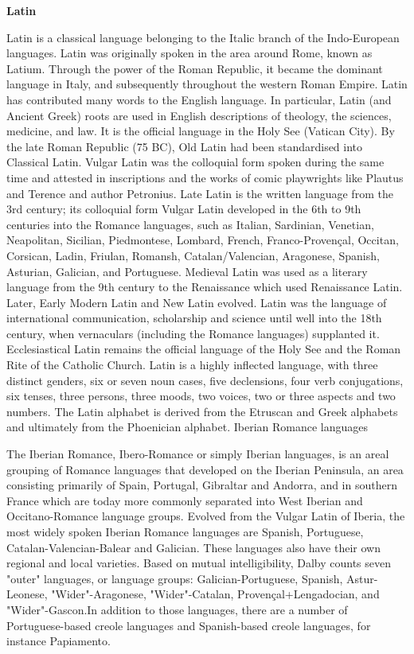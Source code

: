 \documentclass[11pt]{scrartcl} %
\begin{document}
\noindent \textbf{Latin} \par

Latin is a classical language belonging to the Italic branch of the Indo-European languages. Latin was originally spoken in the area around Rome, known as Latium. Through the power of the Roman Republic, it became the dominant language in Italy, and subsequently throughout the western Roman Empire. Latin has contributed many words to the English language. In particular, Latin (and Ancient Greek) roots are used in English descriptions of theology, the sciences, medicine, and law. It is the official language in the Holy See (Vatican City). By the late Roman Republic (75 BC), Old Latin had been standardised into Classical Latin. Vulgar Latin was the colloquial form spoken during the same time and attested in inscriptions and the works of comic playwrights like Plautus and Terence and author Petronius. Late Latin is the written language from the 3rd century; its colloquial form Vulgar Latin developed in the 6th to 9th centuries into the Romance languages, such as Italian, Sardinian, Venetian, Neapolitan, Sicilian, Piedmontese, Lombard, French, Franco-Provençal, Occitan, Corsican, Ladin, Friulan, Romansh, Catalan/Valencian, Aragonese, Spanish, Asturian, Galician, and Portuguese. Medieval Latin was used as a literary language from the 9th century to the Renaissance which used Renaissance Latin. Later, Early Modern Latin and New Latin evolved. Latin was the language of international communication, scholarship and science until well into the 18th century, when vernaculars (including the Romance languages) supplanted it. Ecclesiastical Latin remains the official language of the Holy See and the Roman Rite of the Catholic Church. Latin is a highly inflected language, with three distinct genders, six or seven noun cases, five declensions, four verb conjugations, six tenses, three persons, three moods, two voices, two or three aspects and two numbers. The Latin alphabet is derived from the Etruscan and Greek alphabets and ultimately from the Phoenician alphabet.
Iberian Romance languages \par
The Iberian Romance, Ibero-Romance or simply Iberian languages, is an areal grouping of Romance languages that developed on the Iberian Peninsula, an area consisting primarily of Spain, Portugal, Gibraltar and Andorra, and in southern France which are today more commonly separated into West Iberian and Occitano-Romance language groups. Evolved from the Vulgar Latin of Iberia, the most widely spoken Iberian Romance languages are Spanish, Portuguese, Catalan-Valencian-Balear and Galician. These languages also have their own regional and local varieties. Based on mutual intelligibility, Dalby counts seven "outer" languages, or language groups: Galician-Portuguese, Spanish, Astur-Leonese, "Wider"-Aragonese, "Wider"-Catalan, Provençal+Lengadocian, and "Wider"-Gascon.In addition to those languages, there are a number of Portuguese-based creole languages and Spanish-based creole languages, for instance Papiamento. \par
\end{document}
